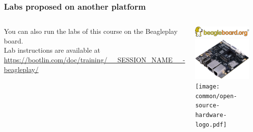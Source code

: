 \begin{frame}
\frametitle{Labs proposed on another platform}
  \begin{columns}
    You can also run the labs of this course on the Beagleplay board.\\
    \vspace{1em}
    Lab instructions are available at\\
    {\small \url{https://bootlin.com/doc/training/__SESSION_NAME__-beagleplay/}}
    \begin{center}
      \includegraphics[width=\textwidth]{../slides/beagleplay-board/beagle_logo_326x60.png}\\
      \includegraphics[width=\textwidth]{../slides/beagleplay-board/beagleplay.png}\\
      \texttt{[image: common/open-source-hardware-logo.pdf]}
    \end{center}
  \end{columns}
\end{frame}
